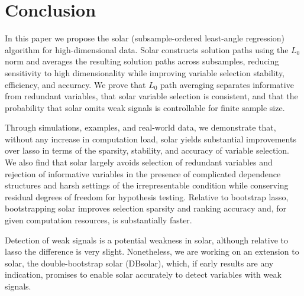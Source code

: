 \documentclass[11pt,review,authoryear]{elsarticle}
\begin{document}

\section{Conclusion}

In this paper we propose the solar (subsample-ordered least-angle regression) algorithm for high-dimensional data. Solar constructs solution paths using the $L_0$ norm and averages the resulting solution paths across subsamples, reducing sensitivity to high dimensionality while improving variable selection stability, efficiency, and accuracy. We prove that $L_0$ path averaging separates informative from redundant variables, that solar variable selection is consistent, and that the probability that solar omits weak signals is controllable for finite sample size.

Through simulations, examples, and real-world data, we demonstrate that, without any increase in computation load, solar yields substantial improvements over lasso in terms of the sparsity, stability, and accuracy of variable selection. We also find that solar largely avoids selection of redundant variables and rejection of informative variables in the presence of complicated dependence structures and harsh settings of the irrepresentable condition while conserving residual degrees of freedom for hypothesis testing. Relative to bootstrap lasso, bootstrapping solar improves selection sparsity and ranking accuracy and, for given computation resources, is substantially faster.

Detection of weak signals is a potential weakness in solar, although relative to lasso the difference is very slight. Nonetheless, we are working on an extension to solar, the double-bootstrap solar (DBsolar), which, if early results are any indication, promises to enable solar accurately to detect variables with weak signals.



%


\end{document}
